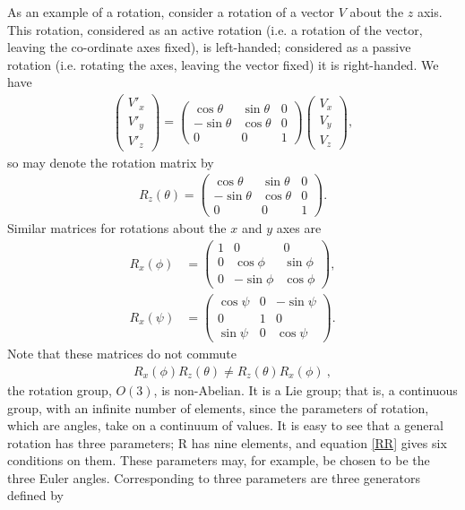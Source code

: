 \documentclass[12pt,a4paper]{report}
\begin{document}
As an example of a rotation, consider a rotation of a vector $V$ about the $z$ axis. This rotation, considered as an active rotation (i.e. a rotation of the vector, leaving the co-ordinate axes fixed), is left-handed; considered as a passive rotation (i.e. rotating the axes, leaving the vector fixed) it is right-handed. We have 
\begin{align}
    \begin{pmatrix}
  V'_x\\ 
  V'_y\\
  V'_z
\end{pmatrix}=\begin{pmatrix}
  \cos{\theta} & \sin{\theta} & 0\\ 
  -\sin{\theta} & \cos{\theta} & 0\\
  0 & 0 & 1
\end{pmatrix}\begin{pmatrix}
  V_x\\ 
  V_y\\
  V_z
\end{pmatrix},
\end{align}
so may denote the rotation matrix by
\begin{align}
    R_z(\theta)=\begin{pmatrix}
  \cos{\theta} & \sin{\theta} & 0\\ 
  -\sin{\theta} & \cos{\theta} & 0\\
  0 & 0 & 1
\end{pmatrix}.\label{2.28}
\end{align}
Similar matrices for rotations about the $x$ and $y$ axes are
\begin{align}
    R_x(\phi)&=\begin{pmatrix}
    1 & 0 & 0 \\
  0 & \cos{\phi} & \sin{\phi} \\ 
  0 & -\sin{\phi} & \cos{\phi}
\end{pmatrix},\\
R_x(\psi)&=\begin{pmatrix}
    \cos{\psi} & 0 & -\sin{\psi}\\
    0 & 1 & 0\\
    \sin{\psi}&0&\cos{\psi}
\end{pmatrix}.
\end{align}
Note that these matrices do not commute 
\begin{align}
    R_x(\phi)R_z(\theta)\neq R_z(\theta)R_x(\phi)\label{comm}~,
\end{align}
the rotation group, $O(3)$, is non-Abelian. It is a Lie group; that is, a continuous group, with an infinite number of elements, since the parameters of rotation, which are angles, take on a continuum of values. It is easy to see that a general rotation has three parameters; R has nine elements, and equation \eqref{RR}  gives six conditions on them. These parameters may, for example, be chosen to be the three Euler angles. Corresponding to three parameters are three generators defined by
\end{document}
